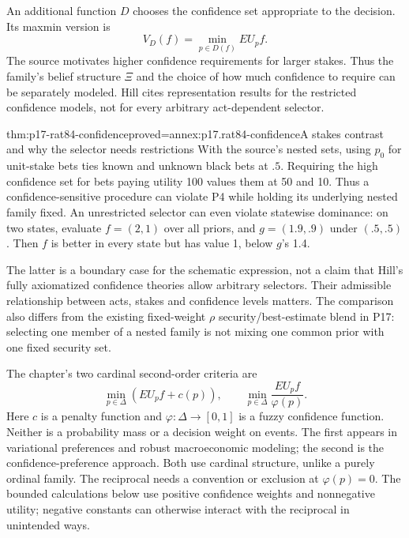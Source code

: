 An additional function \(D\) chooses the confidence set appropriate
to the decision. Its maxmin version is
\[
                       V_D(f)=\min_{p\in D(f)}EU_p f.
\]
The source motivates higher confidence requirements for larger stakes.
Thus the family's belief structure \(\Xi\) and the choice of how
much confidence to require can be separately modeled. Hill cites
representation results for the restricted confidence models, not for
every arbitrary act-dependent selector.
\cite[Sec.~4, pp.~500--502]{Hill2021DecisionUncertainty}

\begin{hblemma}{thm:p17-rat84-confidence}{proved=annex:p17.rat84-confidence}{A stakes contrast and why the selector needs restrictions}
With the source's nested sets, using \(p_0\) for unit-stake bets
ties known and unknown black bets at \(.5\). Requiring the high
confidence set for bets paying utility 100 values them at 50 and 10.
Thus a confidence-sensitive procedure can violate P4 while holding
its underlying nested family fixed.
An unrestricted selector can even violate statewise dominance:
on two states, evaluate \(f=(2,1)\) over all priors, and
\(g=(1.9,.9)\) under \((.5,.5)\). Then \(f\) is better in
every state but has value 1, below \(g\)'s 1.4.
\end{hblemma}

The latter is a boundary case for the schematic expression, not a
claim that Hill's fully axiomatized confidence theories allow arbitrary
selectors. Their admissible relationship between acts, stakes and
confidence levels matters. The comparison also differs from the existing
fixed-weight \(\rho\) security/best-estimate blend in P17: selecting
one member of a nested family is not mixing one common prior with
one fixed security set.

The chapter's two cardinal second-order criteria are
\[
       \min_{p\in\Delta}(EU_p f+c(p)),\qquad
       \min_{p\in\Delta}\frac{EU_p f}{\varphi(p)}.
\]
Here \(c\) is a penalty function and \(\varphi:\Delta\to[0,1]\)
is a fuzzy confidence function. Neither is a probability mass or a
decision weight on events. The first appears in variational preferences
and robust macroeconomic modeling; the second is the confidence-preference
approach. Both use cardinal structure, unlike a purely ordinal family.
The reciprocal needs a convention or exclusion at \(\varphi(p)=0\).
The bounded calculations below use positive confidence weights and
nonnegative utility; negative constants can otherwise interact with
the reciprocal in unintended ways.

